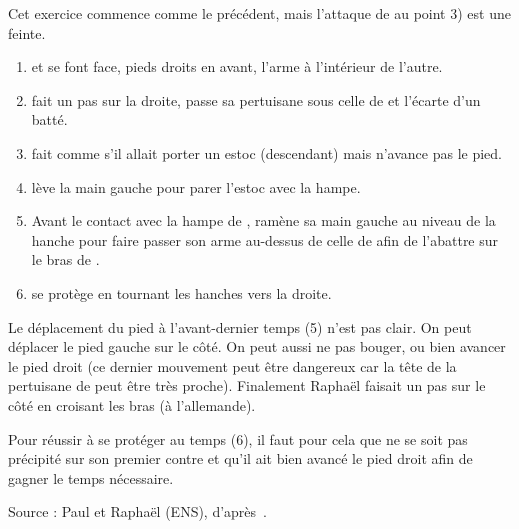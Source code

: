 \begin{technique}

Cet exercice commence comme le précédent, mais l'attaque de \A au point 3) est une feinte.
\begin{enumerate}
	\item \A et \D se font face, pieds droits en avant, l'arme à l'intérieur de l'autre.
	
	\item \A fait un pas sur la droite, passe sa pertuisane sous celle de \D et l'écarte d'un batté.
	
	\item \A fait comme s'il allait porter un estoc (descendant) mais n'avance pas le pied.
	
	\item \D lève la main gauche pour parer l'estoc avec la hampe.
	
	\item Avant le contact avec la hampe de \D, \A ramène sa main gauche au niveau de la hanche pour faire passer son arme au-dessus de celle de \D afin de l'abattre sur le bras de \D.
	
	\item \D se protège en tournant les hanches vers la droite.
\end{enumerate}

Le déplacement du pied à l'avant-dernier temps (5) n'est pas clair. On peut déplacer le pied gauche sur le côté. On peut aussi ne pas bouger, ou bien avancer le pied droit (ce dernier mouvement peut être dangereux car la tête de la pertuisane de \D peut être très proche). Finalement Raphaël faisait un pas sur le côté en croisant les bras (à l'allemande).

Pour réussir à se protéger au temps (6), il faut pour cela que \D ne se soit pas précipité sur son premier contre et qu'il ait bien avancé le pied droit afin de gagner le temps nécessaire.

Source : Paul et Raphaël (ENS), d'après~\cite{livermore:cornucopia:partizan:2014}.
\end{technique}
